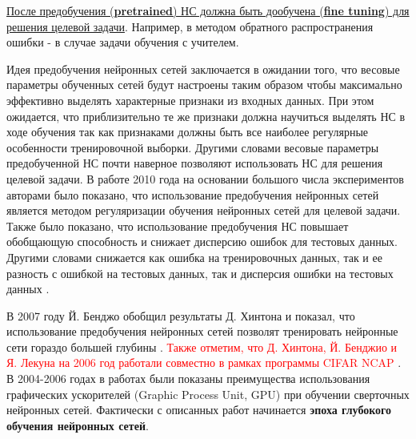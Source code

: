 \documentclass[12pt]{article}
\begin{document}
\begin{sloppypar}
\uline{После предобучения (\textbf{pretrained}) НС должна быть дообучена (\textbf{fine tuning}) для решения целевой задачи}. Например, в  методом обратного распространения ошибки - в случае задачи обучения с учителем. 

Идея предобучения нейронных сетей заключается в ожидании того, что весовые параметры обученных сетей будут настроены таким образом чтобы максимально эффективно выделять характерные признаки из входных данных. При этом ожидается, что приблизительно те же признаки должна научиться выделять НС в ходе обучения так как признаками должны быть все наиболее регулярные особенности тренировочной выборки. Другими словами весовые параметры предобученной НС почти наверное позволяют использовать НС для решения целевой задачи. 
В работе 2010 года \cite{erhan2010does} на основании большого числа экспериментов авторами было показано, что использование предобучения нейронных сетей является методом регуляризации обучения нейронных сетей для целевой задачи. Также было показано, что использование предобучения НС повышает обобщающую способность и снижает дисперсию ошибок для тестовых данных. Другими словами снижается как ошибка на тренировочных данных, так и ее разность с ошибкой на тестовых данных, так и дисперсия ошибки на тестовых данных \cite{erhan2010does}. 

В 2007 году Й. Бенджо обобщил результаты Д. Хинтона и показал, что использование предобучения нейронных сетей позволят тренировать нейронные сети гораздо большей глубины \cite{bengio2007greedy}.
\textcolor{red}{
Также отметим, что Д. Хинтона, Й. Бенджио и Я. Лекуна на 2006 год работали совместно в рамках программы CIFAR NCAP} \cite{goodfellow2016deep}. 
В 2004-2006 годах в работах \cite{oh2004gpu, steinkraus2005using, chellapilla2006high} были показаны преимущества использования графических ускорителей (Graphic Process Unit, GPU)  при обучении сверточных нейронных сетей.
Фактически с описанных работ начинается 
\textbf{эпоха глубокого обучения нейронных сетей}.

\newpage

\end{sloppypar}
\end{document}
